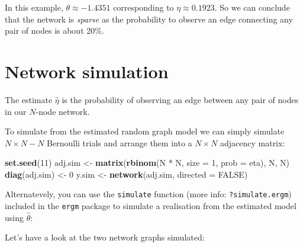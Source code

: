 \documentclass[]{book}
\newenvironment{Shaded}{\begin{snugshade}}{\end{snugshade}}
\newcommand{\KeywordTok}[1]{\textcolor[rgb]{0.13,0.29,0.53}{\textbf{{#1}}}}
\newcommand{\DataTypeTok}[1]{\textcolor[rgb]{0.13,0.29,0.53}{{#1}}}
\newcommand{\DecValTok}[1]{\textcolor[rgb]{0.00,0.00,0.81}{{#1}}}
\newcommand{\FloatTok}[1]{\textcolor[rgb]{0.00,0.00,0.81}{{#1}}}
\newcommand{\StringTok}[1]{\textcolor[rgb]{0.31,0.60,0.02}{{#1}}}
\newcommand{\OtherTok}[1]{\textcolor[rgb]{0.56,0.35,0.01}{{#1}}}
\newcommand{\NormalTok}[1]{{#1}}
\begin{document}
In this example, \(\theta \approx -1.4351\) corresponding to
\(\eta \approx 0.1923\). So we can conclude that the network is
\emph{sparse} as the probability to observe an edge connecting any pair
of nodes is about 20\%.

\section{Network simulation}\label{network-simulation}

The estimate \(\hat{\eta}\) is the probability of observing an edge
between any pair of nodes in our \(N\)-node network.

To simulate from the estimated random graph model we can simply simulate
\(N \times N - N\) Bernoulli trials and arrange them into a
\(N \times N\) adjacency matrix:

\begin{Shaded}
\begin{Highlighting}[]
\KeywordTok{set.seed}\NormalTok{(}\DecValTok{11}\NormalTok{)}
\NormalTok{adj.sim <-}\StringTok{ }\KeywordTok{matrix}\NormalTok{(}\KeywordTok{rbinom}\NormalTok{(N *}\StringTok{ }\NormalTok{N, }\DataTypeTok{size =} \DecValTok{1}\NormalTok{, }\DataTypeTok{prob =} \NormalTok{eta), N, N)}
\KeywordTok{diag}\NormalTok{(adj.sim) <-}\StringTok{ }\DecValTok{0}
\NormalTok{y.sim <-}\StringTok{ }\KeywordTok{network}\NormalTok{(adj.sim, }\DataTypeTok{directed =} \OtherTok{FALSE}\NormalTok{)}
\end{Highlighting}
\end{Shaded}

Alternatevely, you can use the \texttt{simulate} function (more info:
\texttt{?simulate.ergm}) included in the \texttt{ergm} package to
simulate a realisation from the estimated model using \(\hat{\theta}\):

\begin{Shaded}
\end{Shaded}

Let's have a look at the two network graphs simulated:
\end{document}
